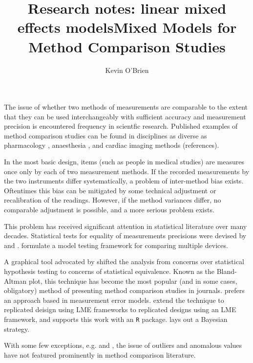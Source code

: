 \documentclass[12pt, a4paper]{report}
\title{Research notes: linear mixed effects models}
\author{ } \date{ }
\theoremstyle{plain}
\theoremstyle{definition}
\theoremstyle{remark}
\begin{document}
	\author{Kevin O'Brien}
	\title{Mixed Models for Method Comparison Studies}
	\tableofcontents
	
	\newpage
	

The issue of whether two methods of measurements are 
comparable to the extent that they can be used 
interchangeably with sufficient accuracy and measurement precision is encountered frequency in scientfic research. Published examples of method comparison studies can be found in disciplines
as diverse as pharmacology \citep{ludbrook97}, anaesthesia \citep{Myles}, and cardiac imaging methods \citep{Krumm}(references).


In the most basic design, items (such as people in medical studies) are measures once only by each of two measurement methods. 
If the recorded measurements by the two instruments differ systematically, a problem of inter-method bias exists. Oftentimes this bias can be mitigated by some technical adjustment or recalibration of the readings. However, if the method variances differ, no comparable adjustment is possible, and a more serious problem exists.




This problem has received significant attention in statistical literature over many decades.
Statistical tests for equality of measurements precisions were devised by \citet{pitman} and \citet{morgan}. \citet{Grubbs48,Grubbs73} formulate a model testing framework for comparing multiple devices.




A graphical tool advocated by \citet{BA83,BA86} shifted the analysis from concerns over statistical hypothesis testing to concerns of statistical equivalence. Known as the Bland-Altman plot, this technique has become the most popular (and in some cases, obligatory) method of presenting method comparison studies in journals. \citet{DunnSEME} prefers an approach based in measurement error models. \citet{BXC2008} extend the technique to replicated deisign using LME frameworks to replicated designs using an LME framework, and supports this work with an \texttt{R} package. \citet{broemeling2009} lays out a Bayesian strategy.


With some few exceptions, e.g. \citet{hawkins1978} and \citet{Bartko}, the issue of outliers and anomalous values have not featured prominently in method comparison literature.
\end{document}
